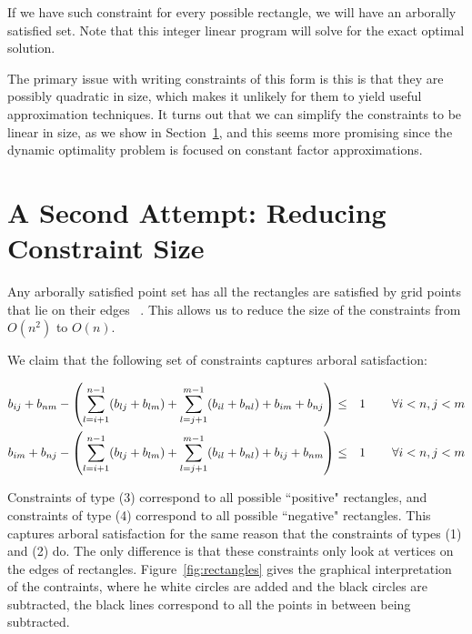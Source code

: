 \documentclass[11pt]{article}
\begin{document}
If we have such constraint for every possible rectangle, we will have an arborally satisfied set. Note that this integer linear program will solve for the exact optimal solution.

The primary issue with writing constraints of this form is this is that they are possibly quadratic in size, which makes it unlikely for them to yield useful approximation techniques. It turns out that we can simplify the constraints to be linear in size, as we show in Section~\ref{A Second Attempt: Reducing Constraint Size}, and this seems more promising since the dynamic optimality problem is focused on constant factor approximations. 

\section{A Second Attempt: Reducing Constraint Size}
\label{A Second Attempt: Reducing Constraint Size}

Any arborally satisfied point set has all the rectangles are satisfied by grid points that lie on their edges ~\cite{geometryBST}. This allows us to reduce the size of the constraints from $O(n^2)$ to $O(n)$.

We claim that the following set of constraints captures arboral satisfaction: 

\begin{align}
b_{ij} + b_{nm} - \left(\sum_{l=i+1}^{n-1} (b_{lj}+b_{lm}) + \sum_{l=j+1}^{m-1} (b_{il} + b_{nl}) + b_{im} + b_{nj} \right) &\leq& 1 & \hspace{.3in} \forall i<n, j<m \\
b_{im} + b_{nj} - \left(\sum_{l=i+1}^{n-1} (b_{lj}+b_{lm}) + \sum_{l=j+1}^{m-1} (b_{il} + b_{nl}) + b_{ij} + b_{nm} \right) &\leq& 1 & \hspace{.3in} \forall i<n, j<m
\end{align}

Constraints of type (3) correspond to all possible ``positive" rectangles, and constraints of type (4) correspond to all possible ``negative" rectangles. This captures arboral satisfaction for the same reason that the constraints of types (1) and (2) do. The only difference is that these constraints only look at vertices on the edges of rectangles. Figure~\ref{fig:rectangles} gives the graphical interpretation of the contraints, where he white circles are added  and the black circles are subtracted, the black lines correspond to all the points in between being subtracted.
\end{document}
